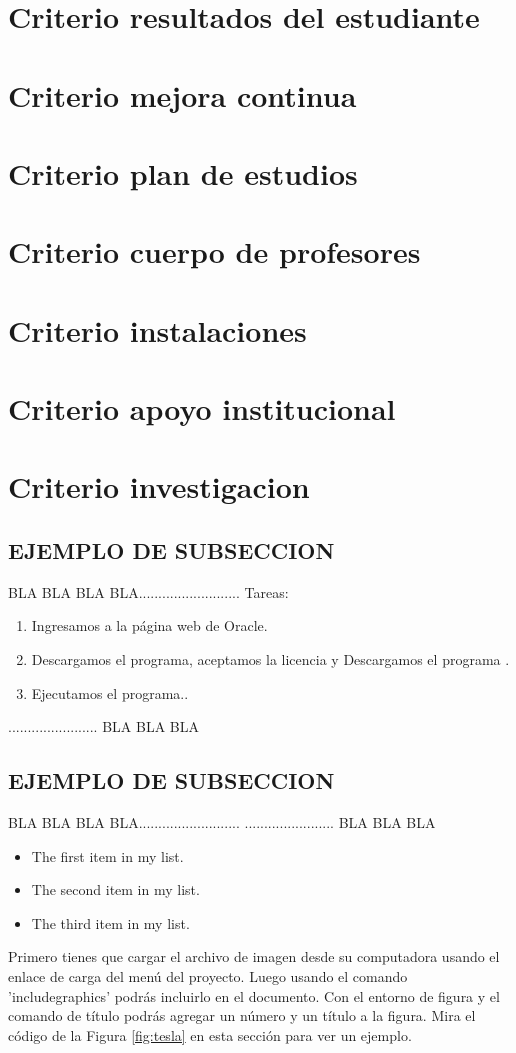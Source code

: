 \documentclass[12pt,a4paper]{report}
\begin{document}
\section{ Criterio resultados del estudiante}

\section{ Criterio mejora continua}

\section{ Criterio plan de estudios}

\section{ Criterio cuerpo de profesores}

\section{ Criterio instalaciones}

\section{ Criterio apoyo institucional}

\section{ Criterio investigacion}

\subsection{EJEMPLO DE SUBSECCION}
BLA BLA BLA BLA..........................
Tareas:
\begin{enumerate}
    \item Ingresamos a la página web de Oracle.
    \item Descargamos el programa, aceptamos la licencia y Descargamos el programa .
    \item Ejecutamos el programa..
\end{enumerate}
....................... BLA BLA BLA
\subsection{EJEMPLO DE SUBSECCION}
BLA BLA BLA BLA..........................
....................... BLA BLA BLA
\begin{itemize}
\item The first item in my list. 
\item The second item in my list.
\item The third item in my list.
\end{itemize}
Primero tienes que cargar el archivo de imagen desde su computadora usando el enlace de carga del menú del proyecto. Luego usando el comando 'includegraphics' podrás incluirlo en el documento. Con el entorno de figura y el comando de título podrás agregar un número y un título a la figura. Mira el código de la Figura \ref{fig:tesla} en esta sección para ver un ejemplo.
\end{document}
